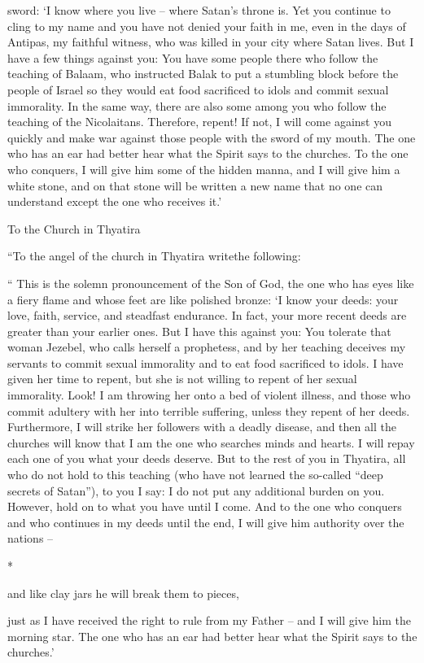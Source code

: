 {sword:
‘I know
where
you live
– where
Satan’s
throne
is. Yet
you continue to cling
to my
name
and
you have
not
denied
your faith
in me,
even
in
the days
of Antipas,
my
faithful
witness,
who
was killed
in
your
city where
Satan
lives.
But
I have
a few things
against
you: You
have
some people there
who follow
the teaching
of Balaam,
who
instructed
Balak
to put
a stumbling block
before
the people
of Israel
so they would eat
food sacrificed to idols
and
commit sexual immorality.
In the same way,
there are also some among you
who follow
the teaching
of the Nicolaitans.
Therefore,
repent! If
not,
I will come
against you
quickly
and
make war
against
those people
with
the sword
of my
mouth.
The one who has
an ear
had better hear
what
the Spirit
says
to the churches.
To the one who conquers,
I will give
him
some of the hidden
manna,
and
I will give
him
a white
stone,
and
on
that stone
will be written
a new
name
that
no one
can understand
except
the one who receives it.’
\par }{\SH To the Church in Thyatira
\par }{\PP {}“To the angel
of the church
in
Thyatira
writethe following:
\par }{\PP “
This
is the solemn pronouncement
of the Son
of God,
the one who has
eyes
like
a fiery
flame
and
whose
feet
are like
polished bronze:
‘I know
your
deeds: your
love,
faith,
service,
and
steadfast endurance.
In fact, your
more recent
deeds
are greater than
your earlier ones.
But
I have
this against
you: You tolerate
that
woman
Jezebel,
who calls
herself
a prophetess,
and
by her teaching
deceives
my
servants
to commit sexual immorality
and
to eat
food sacrificed to idols.
I have given
her
time
to
repent,
but
she is
not
willing
to repent
of
her
sexual immorality.
Look! I am throwing
her
onto
a bed of violent illness,
and
those who commit adultery
with
her
into
terrible
suffering,
unless
they repent
of
her
deeds.
Furthermore,
I will strike
her
followers
with
a deadly disease,
and then
all
the churches
will know
that
I
am
the one who searches
minds
and
hearts.
I will repay
each one
of you
what
your
deeds deserve.
But
to the rest
of you
in
Thyatira,
all
who do
not
hold
to this
teaching
(who
have
not
learned
the so-called “deep secrets
of Satan”), to you I say: I do
not
put
any additional
burden
on
you.
However,
hold on
to what
you have
until
I come.
And
to the one who conquers
and
who continues
in my
deeds
until
the end,
I will give
him
authority
over
the nations –
\par }{\Q {}*
\par }{\Q and like
clay
jars
he will break them to pieces,
\par }{\PP {}just as I have received the right to rule from my Father – and I will give him the morning star.
The one who has
an ear
had better hear
what
the Spirit
says
to the churches.’

}
